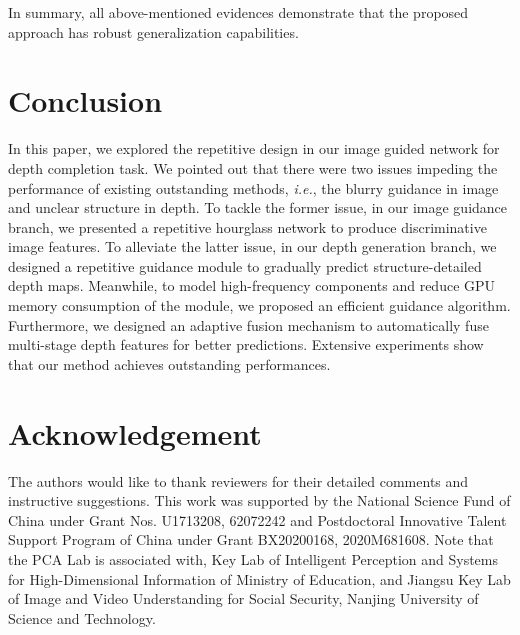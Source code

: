 \documentclass[runningheads]{llncs}
\begin{document}
In summary, all above-mentioned evidences demonstrate that the proposed approach has robust generalization capabilities.

\section{Conclusion}
In this paper, we explored the repetitive design in our image guided network for depth completion task. We pointed out that there were two issues impeding the performance of existing outstanding methods, \emph{i.e.}, the blurry guidance in image and unclear structure in depth. To tackle the former issue, in our image guidance branch, we presented a repetitive hourglass network to produce discriminative image features. To alleviate the latter issue, in our depth generation branch, we designed a repetitive guidance module to gradually predict structure-detailed depth maps. Meanwhile, to model high-frequency components and reduce GPU memory consumption of the module, we proposed an efficient guidance algorithm. Furthermore, we designed an adaptive fusion mechanism to automatically fuse multi-stage depth features for better predictions. Extensive experiments show that our method achieves outstanding performances.

\section{Acknowledgement}
The authors would like to thank reviewers for their detailed comments and instructive suggestions. This work was supported by the National Science Fund of China under Grant Nos. U1713208, 62072242 and Postdoctoral Innovative Talent Support Program of China under Grant BX20200168, 2020M681608. Note that the PCA Lab is associated with, Key Lab of Intelligent Perception and Systems for High-Dimensional Information of Ministry of Education, and Jiangsu Key Lab of Image and Video Understanding for Social Security, Nanjing University of Science and Technology.






\end{document}
